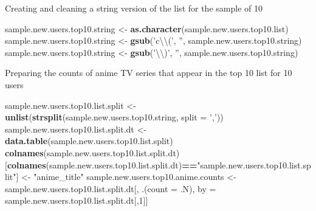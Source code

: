 \documentclass[
  ignorenonframetext,
]{beamer}
\newenvironment{Shaded}{\begin{snugshade}}{\end{snugshade}}
\newcommand{\CharTok}[1]{\textcolor[rgb]{0.31,0.60,0.02}{#1}}
\newcommand{\DataTypeTok}[1]{\textcolor[rgb]{0.13,0.29,0.53}{#1}}
\newcommand{\DecValTok}[1]{\textcolor[rgb]{0.00,0.00,0.81}{#1}}
\newcommand{\KeywordTok}[1]{\textcolor[rgb]{0.13,0.29,0.53}{\textbf{#1}}}
\newcommand{\NormalTok}[1]{#1}
\newcommand{\OperatorTok}[1]{\textcolor[rgb]{0.81,0.36,0.00}{\textbf{#1}}}
\newcommand{\StringTok}[1]{\textcolor[rgb]{0.31,0.60,0.02}{#1}}
\begin{document}
\begin{frame}[fragile]{Creating and cleaning a string version of the
list for the sample of 10}
\protect\hypertarget{creating-and-cleaning-a-string-version-of-the-list-for-the-sample-of-10}{}

\begin{Shaded}
\begin{Highlighting}[]
\NormalTok{sample.new.users.top10.string <-}\StringTok{ }\KeywordTok{as.character}\NormalTok{(sample.new.users.top10.list)}
\NormalTok{sample.new.users.top10.string <-}\StringTok{ }\KeywordTok{gsub}\NormalTok{(}\StringTok{'c}\CharTok{\textbackslash{}\textbackslash{}}\StringTok{('}\NormalTok{, }\StringTok{''}\NormalTok{, sample.new.users.top10.string)}
\NormalTok{sample.new.users.top10.string <-}\StringTok{ }\KeywordTok{gsub}\NormalTok{(}\StringTok{'}\CharTok{\textbackslash{}\textbackslash{}}\StringTok{)'}\NormalTok{, }\StringTok{''}\NormalTok{, sample.new.users.top10.string)}
\end{Highlighting}
\end{Shaded}

\end{frame}

\begin{frame}[fragile]{Preparing the counts of anime TV series that
appear in the top 10 list for 10 users}
\protect\hypertarget{preparing-the-counts-of-anime-tv-series-that-appear-in-the-top-10-list-for-10-users}{}

\begin{Shaded}
\begin{Highlighting}[]
\NormalTok{sample.new.users.top10.list.split <-}\StringTok{ }\KeywordTok{unlist}\NormalTok{(}\KeywordTok{strsplit}\NormalTok{(sample.new.users.top10.string, }\DataTypeTok{split =} \StringTok{','}\NormalTok{))}
\NormalTok{sample.new.users.top10.list.split.dt <-}\StringTok{ }\KeywordTok{data.table}\NormalTok{(sample.new.users.top10.list.split)}
\KeywordTok{colnames}\NormalTok{(sample.new.users.top10.list.split.dt)[}\KeywordTok{colnames}\NormalTok{(sample.new.users.top10.list.split.dt)}\OperatorTok{==}\StringTok{"sample.new.users.top10.list.split"}\NormalTok{] <-}\StringTok{ "anime_title"}
\NormalTok{sample.new.users.top10.anime.counts <-}\StringTok{ }\NormalTok{sample.new.users.top10.list.split.dt[, .(}\DataTypeTok{count =}\NormalTok{ .N), by =}\StringTok{ }\NormalTok{sample.new.users.top10.list.split.dt[,}\DecValTok{1}\NormalTok{]]}
\end{Highlighting}
\end{Shaded}

\end{frame}
\end{document}
